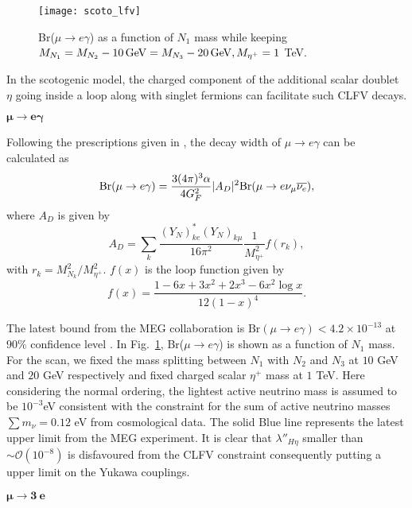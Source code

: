 \documentclass[prd,nofootinbib,preprint,superscriptaddress]{revtex4}
\begin{document}
\begin{figure}[h!]
\centering
\texttt{[image: scoto\_lfv]}
\caption{Br($\mu \rightarrow e \gamma$) as a function of $N_1$ mass while keeping $M_{N_1}=M_{N_2}-10 \, {\rm GeV} = M_{N_3}-20 \, {\rm GeV}, M_{\eta^+} = 1$ TeV.}
\label{scotolfv}
\end{figure}

In the scotogenic model, the charged component of the additional scalar doublet $\eta$ going inside a loop along with singlet fermions can facilitate such CLFV decays. 

{\underline{ $\pmb{\mu\to e \gamma}$}}

Following the prescriptions given in \cite{Lavoura:2003xp, Toma:2013zsa}, the decay width of $\mu \rightarrow e \gamma$ can be calculated as
\begin{align}
{\rm Br} (\mu \rightarrow e \gamma) =\frac{3 (4\pi)^3 \alpha}{4G^2_F} \lvert A_D \rvert^2 {\rm Br} (\mu \rightarrow e \nu_{\mu} \overline{\nu_e}),
\end{align}
where $A_D$ is given by
\begin{equation}
A_D = \sum_{k} \frac{(Y_N)^*_{ke} (Y_N)_{k\mu}}{16 \pi^2} \frac{1}{M^2_{\eta^+}} f (r_k),
\label{ADMEG}
\end{equation}
with $r_k = M^2_{N_k}/M^2_{\eta^+}$. $f(x)$ is the loop function given by
\begin{equation}
f(x)=\frac{1-6x+3x^2+2x^3-6x^2\log{x}}{12 (1-x)^4}.
\label{loop1}
\end{equation}

The latest bound from the MEG collaboration is $\text{Br}(\mu \rightarrow e \gamma) < 4.2 \times 10^{-13}$ at $90\%$ confidence level \cite{TheMEG:2016wtm}. 
In Fig.~\ref{scotolfv}, Br($\mu \rightarrow e \gamma$) is shown as a function of $N_1$ mass. For the scan, we fixed the mass splitting between $N_1$ with $N_2$ and $N_3$ at $10$ GeV and $20$ GeV respectively and fixed charged scalar $\eta^+$ mass at $1$ TeV.  Here considering the normal ordering, the lightest active neutrino mass is assumed to be $10^{-3}$eV consistent with the constraint for the sum of active neutrino masses $\sum m_{\nu}= 0.12$ eV from cosmological data. The solid Blue line represents the latest upper limit from the MEG experiment. It is clear that $\lambda''_{H\eta}$ smaller than $\sim \mathcal{O}(10^{-8})$ is disfavoured from the CLFV constraint consequently putting a upper limit on the Yukawa couplings. 


\underline{ $\pmb{\mu\to 3 ~e}$}
\end{document}
